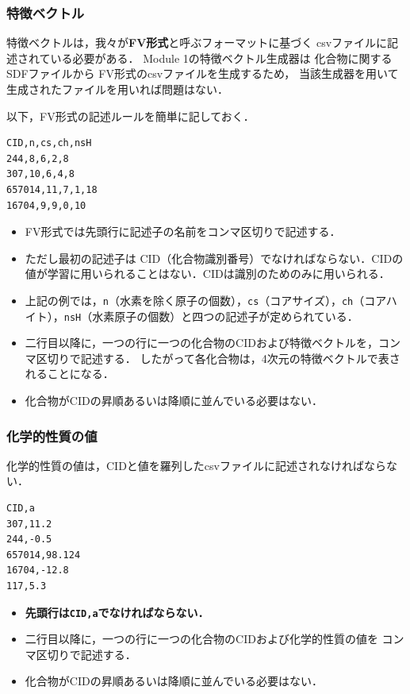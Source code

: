 \documentclass[11pt, titlepage, dvipdfmx, twoside]{jarticle}
\begin{document}
\subsubsection{特徴ベクトル}
特徴ベクトルは，我々が{\bf FV形式}と呼ぶフォーマットに基づく
csvファイルに記述されている必要がある．
Module 1の特徴ベクトル生成器は
化合物に関するSDFファイルから
FV形式のcsvファイルを生成するため，
当該生成器を用いて生成されたファイルを用いれば問題はない．

以下，FV形式の記述ルールを簡単に記しておく．
\begin{oframed}
  {\small
\begin{verbatim}
CID,n,cs,ch,nsH
244,8,6,2,8
307,10,6,4,8
657014,11,7,1,18
16704,9,9,0,10
\end{verbatim}
}
\end{oframed}
\begin{itemize}
\item FV形式では先頭行に記述子の名前をコンマ区切りで記述する．
\item ただし最初の記述子は CID（化合物識別番号）でなければならない．CIDの値が学習に用いられることはない．CIDは識別のためのみに用いられる．
\item 上記の例では，\verb|n|（水素を除く原子の個数），\verb|cs|（コアサイズ），\verb|ch|（コアハイト），\verb|nsH|（水素原子の個数）と四つの記述子が定められている．
\item 二行目以降に，一つの行に一つの化合物のCIDおよび特徴ベクトルを，コンマ区切りで記述する．
  したがって各化合物は，4次元の特徴ベクトルで表されることになる．
\item 化合物がCIDの昇順あるいは降順に並んでいる必要はない．
\end{itemize}


\subsubsection{化学的性質の値}
化学的性質の値は，CIDと値を羅列したcsvファイルに記述されなければならない．
\begin{oframed}
  {\small
\begin{verbatim}
CID,a
307,11.2
244,-0.5
657014,98.124
16704,-12.8
117,5.3
\end{verbatim}
}
\end{oframed}
\begin{itemize}
\item {\bf 先頭行は\verb|CID,a|でなければならない．}
\item 二行目以降に，一つの行に一つの化合物のCIDおよび化学的性質の値を
  コンマ区切りで記述する．
\item 化合物がCIDの昇順あるいは降順に並んでいる必要はない．
\end{itemize}
  
\end{document}
